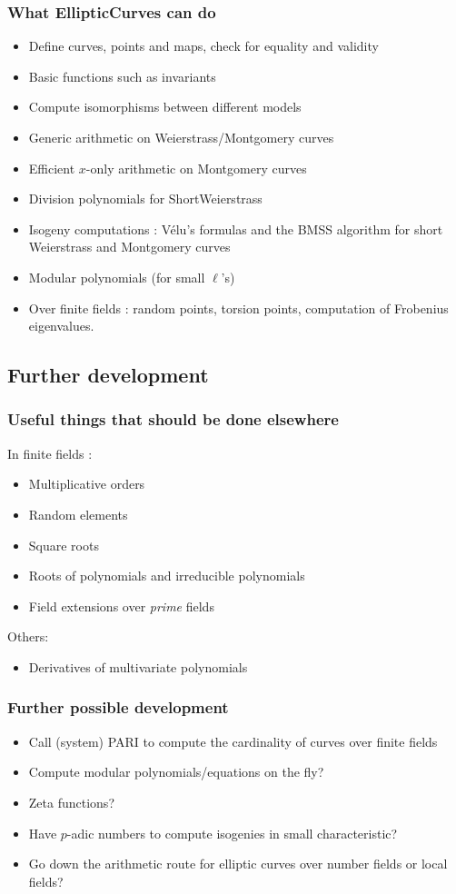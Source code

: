 \documentclass[12pt]{beamer}
\begin{document}
\begin{frame}
 \frametitle{What EllipticCurves can do}
 
 \begin{itemize}
  \item Define curves, points and maps, check for equality and validity
  \item Basic functions such as invariants
  \item Compute isomorphisms between different models
  \item Generic arithmetic on Weierstrass/Montgomery curves
  \item Efficient $x$-only arithmetic on Montgomery curves
  \item Division polynomials for ShortWeierstrass
  \item Isogeny computations : V\'elu's formulas and the BMSS algorithm for short Weierstrass and Montgomery curves
  \item Modular polynomials (for small $\ell$'s)
  \item Over finite fields : random points, torsion points, computation of Frobenius eigenvalues.
 \end{itemize}
\end{frame}

\subsection{Further development}

\begin{frame}
 \frametitle{Useful things that should be done elsewhere}
 In finite fields :
 \begin{itemize}
  \item Multiplicative orders
  \item Random elements
  \item Square roots
  \item Roots of polynomials and irreducible polynomials
  \item Field extensions over \emph{prime} fields
 \end{itemize}
 Others:
 \begin{itemize}
  \item Derivatives of multivariate polynomials
 \end{itemize}
\end{frame}


\begin{frame}
 \frametitle{Further possible development}
 \begin{itemize}
  \item Call (system) PARI to compute the cardinality of curves over finite fields
  \item Compute modular polynomials/equations on the fly?
  \item Zeta functions?   
  \item Have $p$-adic numbers to compute isogenies in small characteristic?
  \item Go down the arithmetic route for elliptic curves over number fields or local fields?
 \end{itemize}
\end{frame}
\end{document}
